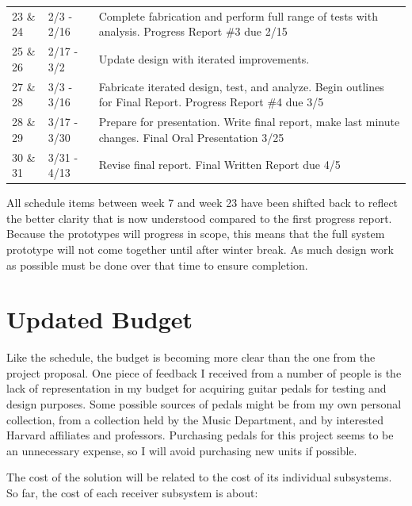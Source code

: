 \documentclass{article}
\begin{document}
\begin{table}[H]
\begin{tabular}{llp{4in}}
	23 \& 24 & 2/3 - 2/16    &  Complete fabrication and perform full range of tests with analysis.  Progress Report \#3 due 2/15    \\
	25 \& 26 & 2/17 - 3/2    &  Update design with iterated improvements.    \\
	27 \& 28 & 3/3 - 3/16    &  Fabricate iterated design, test, and analyze. Begin outlines for Final Report.  Progress Report \#4 due 3/5   \\
	28 \& 29 & 3/17 - 3/30   &  Prepare for presentation.  Write final report, make last minute changes.  Final Oral Presentation 3/25  \\
	30 \& 31 & 3/31 - 4/13   &  Revise final report.  Final Written Report due 4/5    
	\end{tabular}
	\end{table}

	All schedule items between week 7 and week 23 have been shifted back to reflect the better clarity that is now understood compared to the first progress report.  Because the prototypes will progress in scope, this means that the full system prototype will not come together until after winter break.  As much design work as possible must be done over that time to ensure completion.

	\section{Updated Budget}

	
	Like the schedule, the budget is becoming more clear than the one from the project proposal.  One piece of feedback I received from a number of people is the lack of representation in my budget for acquiring guitar pedals for testing and design purposes.  Some possible sources of pedals might be from my own personal collection, from a collection held by the Music Department, and by interested Harvard affiliates and professors.  Purchasing pedals for this project seems to be an unnecessary expense, so I will avoid purchasing new units if possible.  
	

	The cost of the solution will be related to the cost of its individual subsystems.  So far, the cost of each receiver subsystem is about:
\end{document}
